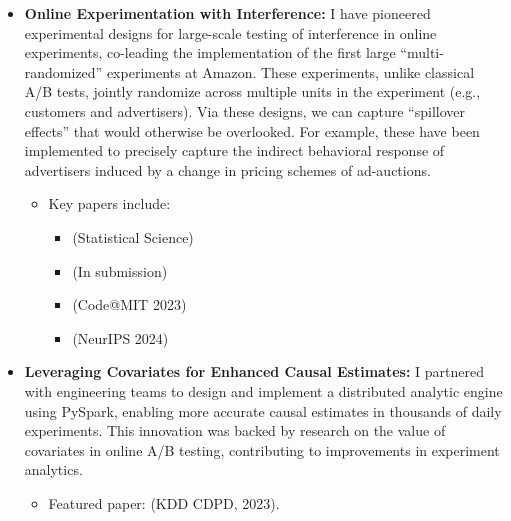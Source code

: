 \documentclass[10pt, a4paper]{article}
\begin{document}
\begin{itemize}
    \item \textbf{Online Experimentation with Interference:} 
    I have pioneered experimental designs for large-scale testing of interference in online experiments, co-leading the implementation of the first large ``multi-randomized'' experiments at Amazon. These experiments, unlike classical A/B tests, jointly randomize across multiple units in the experiment (e.g., customers and advertisers). Via these designs, we can capture ``spillover effects'' that would otherwise be overlooked. For example, these have been implemented to precisely capture the indirect behavioral response of advertisers induced by a change in pricing schemes of ad-auctions.
    \begin{itemize}
        \item Key papers include: 
        \begin{itemize}
            \item {\href{https://projecteuclid.org/journals/statistical-science/advance-publication/Experimental-Design-in-Marketplaces/10.1214/23-STS883.short}{\color{blue}{Experimental Design in Marketplaces}}} (Statistical Science)
            \item \href{https://arxiv.org/abs/2401.01264}{\color{blue}{Multiple Randomization Designs}} (In submission)
            \item \href{https://www.amazon.science/publications/efficient-switchback-experiments-via-multiple-randomization-designs}{\color{blue}{Efficient Switchback Experiments via Multiple Randomization Designs}} (Code@MIT 2023)
            \item \href{https://arxiv.org/abs/2405.18621}{\color{blue}{Multi-Armed Bandits with Network Interference}} (NeurIPS 2024)
        \end{itemize}
    \end{itemize}
    
    \item \textbf{Leveraging Covariates for Enhanced Causal Estimates:}
    I partnered with engineering teams to design and implement a distributed analytic engine using PySpark, enabling more accurate causal estimates in thousands of daily experiments. This innovation was backed by research on the value of covariates in online A/B testing, contributing to improvements in experiment analytics.
    \begin{itemize}
        \item Featured paper: \href{https://proceedings.mlr.press/v218/masoero23a.html}{\color{blue}{Leveraging Covariate Adjustments at Scale in Online A/B Testing}} (KDD CDPD, 2023).
    \end{itemize}
\end{itemize}
\end{document}

